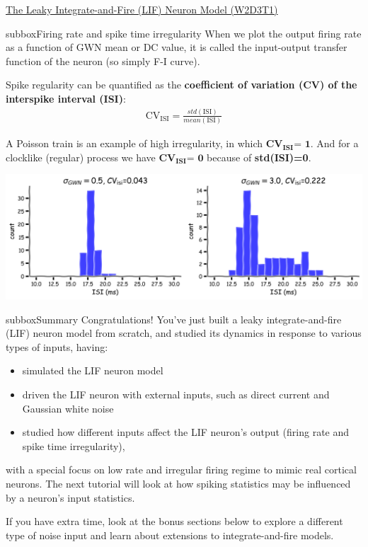 \begin{textbox}{\href{https://compneuro.neuromatch.io/tutorials/W1D4_GeneralizedLinearModels/student/W1D4_Tutorial1.html}{The Leaky Integrate-and-Fire (LIF) Neuron Model (W2D3T1)} }
\begin{subbox}{subbox}{Firing rate and spike time irregularity}
\scriptsize
When we plot the output firing rate as a function of GWN mean or DC value, it is called the input-output transfer function of the neuron (so simply F-I curve).

Spike regularity can be quantified as the \textbf{coefficient of variation (CV) of the interspike interval (ISI)}:
\begin{align}
\text{CV}_{\text{ISI}} = \frac{std(\text{ISI})}{mean(\text{ISI})}
\end{align}

A Poisson train is an example of high irregularity, in which $\textbf{CV}_{\textbf{ISI}} \textbf{= 1}$. And for a clocklike (regular) process we have $\textbf{CV}_{\textbf{ISI}} \textbf{= 0}$ because of \textbf{std(ISI)=0}.

\centering
\includegraphics[scale=0.09]{Figures/BNM/LIF_Figure4.png}
\end{subbox}

\begin{subbox}{subbox}{Summary 
}
\scriptsize
Congratulations! You've just built a leaky integrate-and-fire (LIF) neuron model from scratch, and studied its dynamics in response to various types of inputs, having:
\begin{itemize}
    \item 
 simulated the LIF neuron model
\item 
 driven the LIF neuron with external inputs, such as direct current and Gaussian white noise

\item 
studied how different inputs affect the  LIF neuron's output (firing rate and spike time irregularity),
\end{itemize}

with a special focus on low rate and irregular firing regime to mimic real cortical neurons. The next tutorial will look at how spiking statistics may be influenced by a neuron's input statistics.

If you have extra time, look at the bonus sections below to explore a different type of noise input and learn about extensions to integrate-and-fire models.

\end{subbox}
\end{textbox}
